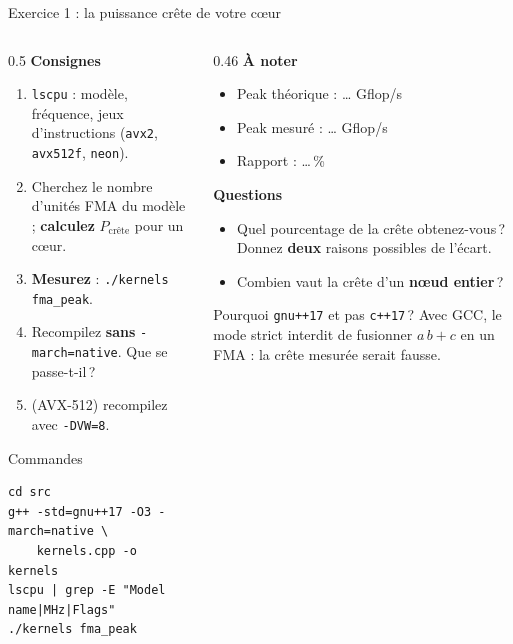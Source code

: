 \documentclass[8pt,aspectratio=169]{beamer}
\begin{document}
\begin{frame}[fragile]{Exercice 1 : la puissance crête de votre cœur}
\begin{columns}[T]
\begin{column}{0.5\textwidth}
\textbf{Consignes}
\begin{enumerate}
\item \texttt{lscpu} : modèle, fréquence, jeux d'instructions (\texttt{avx2}, \texttt{avx512f}, \texttt{neon}).
\item Cherchez le nombre d'unités FMA du modèle ; \textbf{calculez} $P_{\text{crête}}$ pour un cœur.
\item \textbf{Mesurez} : \texttt{./kernels fma\_peak}.
\item Recompilez \textbf{sans} \texttt{-march=native}. Que se passe-t-il\,?
\item (AVX-512) recompilez avec \texttt{-DVW=8}.
\end{enumerate}
\begin{block}{Commandes}
\begin{verbatim}
cd src
g++ -std=gnu++17 -O3 -march=native \
    kernels.cpp -o kernels
lscpu | grep -E "Model name|MHz|Flags"
./kernels fma_peak
\end{verbatim}
\end{block}
\end{column}
\begin{column}{0.46\textwidth}
\textbf{À noter}
\begin{itemize}
\item Peak théorique : \dots{} Gflop/s
\item Peak mesuré : \dots{} Gflop/s
\item Rapport : \dots{}\,\%
\end{itemize}

\medskip
\textbf{Questions}
\begin{itemize}
\item Quel pourcentage de la crête obtenez-vous\,? Donnez \textbf{deux} raisons possibles de l'écart.
\item Combien vaut la crête d'un \textbf{nœud entier}\,?
\end{itemize}

\medskip
\begin{alertblock}{Pourquoi \texttt{gnu++17} et pas \texttt{c++17}\,?}
Avec GCC, le mode strict interdit de fusionner $a\,b+c$ en un FMA : la crête mesurée serait fausse.
\end{alertblock}
\end{column}
\end{columns}
\end{frame}
\end{document}
